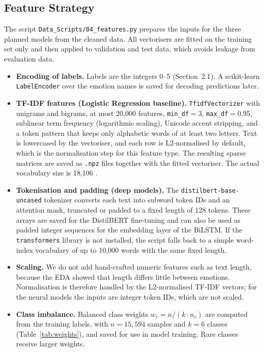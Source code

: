\documentclass[12pt]{article}
\begin{document}
\subsection{Feature Strategy}
The script \texttt{Data\_Scripts/04\_features.py} prepares the inputs for the three planned models from the cleaned data. All vectorisers are fitted on the training set only and then applied to validation and test data, which avoids leakage from evaluation data.

\begin{itemize}
  \item \textbf{Encoding of labels.} Labels are the integers 0--5 (Section~2.1). A scikit-learn \texttt{LabelEncoder} over the emotion names is saved for decoding predictions later.
  \item \textbf{TF-IDF features (Logistic Regression baseline).} \texttt{TfidfVectorizer} with unigrams and bigrams, at most 20{,}000 features, \texttt{min\_df}$=3$, \texttt{max\_df}$=0.95$, sublinear term frequency (logarithmic scaling), Unicode accent stripping, and a token pattern that keeps only alphabetic words of at least two letters. Text is lowercased by the vectoriser, and each row is L2-normalised by default, which is the normalisation step for this feature type. The resulting sparse matrices are saved as \texttt{.npz} files together with the fitted vectoriser. The actual vocabulary size is 18,106 \textcolor{red}.
  \item \textbf{Tokenisation and padding (deep models).} The \texttt{distilbert-base-uncased} tokenizer converts each text into subword token IDs and an attention mask, truncated or padded to a fixed length of 128 tokens. These arrays are saved for the DistilBERT fine-tuning and can also be used as padded integer sequences for the embedding layer of the BiLSTM. If the \texttt{transformers} library is not installed, the script falls back to a simple word-index vocabulary of up to 10{,}000 words with the same fixed length.
  \item \textbf{Scaling.} We do not add hand-crafted numeric features such as text length, because the EDA showed that length differs little between emotions. Normalisation is therefore handled by the L2-normalised TF-IDF vectors; for the neural models the inputs are integer token IDs, which are not scaled.
  \item \textbf{Class imbalance.} Balanced class weights $w_c = n / (k \cdot n_c)$ are computed from the training labels, with $n=15{,}594$ samples and $k=6$ classes (Table~\ref{tab:weights}), and saved for use in model training. Rare classes receive larger weights.
\end{itemize}
\end{document}
